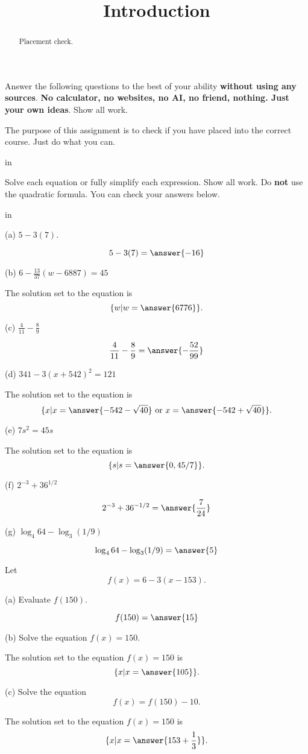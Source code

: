 \documentclass{ximera}
\title{Introduction}
\newcommand{\pskip}{\vskip 0.1 in}
\begin{document}
\begin{abstract}
Placement check. 
\end{abstract}
\maketitle


Answer the following questions to the best of your ability {\bf without using any sources}. {\bf No calculator, no websites, no AI, no friend, nothing. Just your own ideas}. Show all work. %

The purpose of this assignment is to check if you have placed into the correct course. Just do what you can.

\pskip

\begin{question}  \label{Q9df934gmmn}
Solve each equation or fully simplify each expression. Show all work. Do {\bf not} use the quadratic formula. You can check your answers below.

\pskip

(a) $ 5 - 3(7)$.  

\[
       5 - 3(7) =  \answer{-16}
\]

(b) $6 - \frac{13}{37} \left(  w - 6887 \right) = 45$

The solution set to the equation is
\[
    \{w | w= \answer{6776} \} .
\]

(c) $\frac{4}{11} - \frac{8}{9}$

\[
    \frac{4}{11} - \frac{8}{9} = \answer{-\frac{52}{99}} 
\]

(d) $341 - 3 (x+542)^2 =121$

The solution set to the equation is
\[
       \{x | x= \answer{-542 - \sqrt{40}} \text{ or } x= \answer{-542 + \sqrt{40} } \}.
\]

(e) $7s^2 = 45s $

The solution set to the equation is
\[
       \{s | s= \answer{0, 45/7} \}.
\]

(f) $2^{-3} + 36^{1/2}$

\[
     2^{-3} + 36^{-1/2} = \answer{\frac{7}{24}}
\]

(g) $\log_4 64 - \log_3 (1/9)$

\[
   \log_4 64 - \log_3 (1/9) = \answer{5}
\]


\end{question}

\begin{question}  \label{Q:9sdf85r3}
Let 
\[
   f(x) = 6 - 3(x-153) .
\]

(a) Evaluate $f(150)$.

\[
   f(150)=\answer{15}
\]

(b) Solve the equation $f(x)=150$.

The solution set to the equation $f(x)=150$ is
\[
  \{  x | x = \answer{105}  \}.
\]


(c) Solve the equation
\[
      f(x) = f(150)-10 .
\]

The solution set to the equation $f(x)=150$ is
\[
  \{  x | x = \answer{153 + \frac{1}{3}}  \}.
\]

\end{question}  
\end{document}
